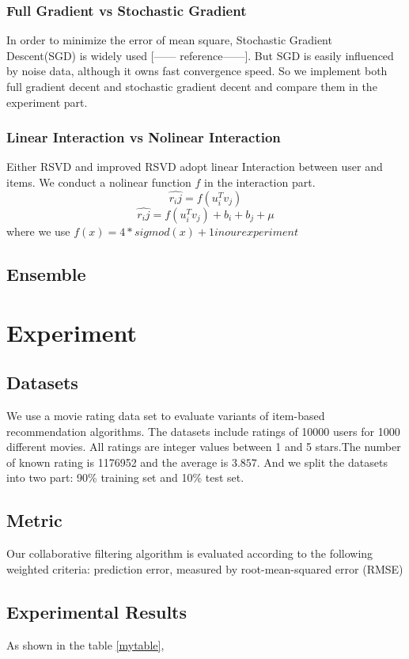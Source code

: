 \documentclass[10pt,conference,compsocconf]{IEEEtran}
\begin{document}
\subsubsection{Full Gradient vs Stochastic Gradient}
In order to minimize the error of mean square, Stochastic Gradient Descent(SGD) is widely used [------ reference------]. But SGD is easily influenced by noise data, although it owns fast convergence speed. So we implement both full gradient decent and stochastic gradient decent and compare them in the experiment part.

\subsubsection{Linear Interaction vs Nolinear Interaction}
Either RSVD and improved RSVD adopt linear Interaction between user and items. We conduct a nolinear function $f$ in the interaction part.
$$ \hat{r_ij}=f(u_{i}^{T}v_{j})$$
$$ \hat{r_ij}=f(u_{i}^{T}v_{j}) + b_i + b_j  + \mu $$
where we use $f(x) = 4*sigmod(x)+1 in our experiment$
\subsection{Ensemble}



\section{Experiment}
\subsection{Datasets}

We use a movie rating data set to evaluate variants of item-based recommendation algorithms. The datasets include ratings of 10000 users for 1000 different movies. All ratings are integer values between 1 and 5 stars.The number of known rating is 1176952 and the average is $3.857$. And we split the datasets into two part: 90\% training set and 10\% test set.

\subsection{Metric}
Our collaborative filtering algorithm is evaluated according to the following weighted criteria:
prediction error, measured by root-mean-squared error (RMSE)

\subsection{Experimental Results}
As shown in the table \ref{mytable}, 
\end{document}
